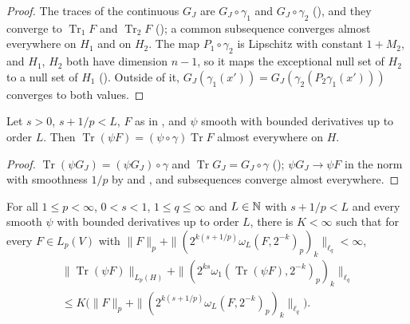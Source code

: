 \begin{proof}
\leanok
The traces of the continuous $G_J$ are $G_J \circ \gamma_1$ and $G_J \circ \gamma_2$
(), and they converge to $\operatorname{Tr}_1 F$ and $\operatorname{Tr}_2 F$
(); a common subsequence converges almost everywhere on $H_1$ and on
$H_2$. The map $P_1 \circ \gamma_2$ is Lipschitz with constant $1 + M_2$, and $H_1$, $H_2$ both have
dimension $n - 1$, so it maps the exceptional null set of $H_2$ to a null set of $H_1$
(). Outside of it, $G_J(\gamma_1(x')) = G_J(\gamma_2(P_2 \gamma_1(x')))$
converges to both values.
\end{proof}

\begin{lemma}
\label{lem:trace-products}
\leanok
{}
Let $s > 0$, $s + 1/p < L$, $F$ as in , and $\psi$ smooth with bounded
derivatives up to order $L$. Then $\operatorname{Tr}(\psi F) = (\psi \circ \gamma) \operatorname{Tr} F$
almost everywhere on $H$.
\end{lemma}

\begin{proof}
\leanok
$\operatorname{Tr}(\psi G_J) = (\psi G_J) \circ \gamma$ and $\operatorname{Tr} G_J = G_J \circ \gamma$
(); $\psi G_J \to \psi F$ in the norm with smoothness $1/p$ by
 and , and subsequences converge almost
everywhere.
\end{proof}

\begin{lemma}
\label{lem:trace-products-bound}
\leanok
{}
For all $1 \leq p < \infty$, $0 < s < 1$, $1 \leq q \leq \infty$ and $L \in \mathbb{N}$ with
$s + 1/p < L$ and every smooth $\psi$ with bounded derivatives up to order $L$, there is
$K < \infty$ such that for every $F \in L_p(V)$ with
$\|F\|_p + \|(2^{k(s + 1/p)} \omega_L(F, 2^{-k})_p)_k\|_{\ell_q} < \infty$,
\begin{multline*}
  \|\operatorname{Tr}(\psi F)\|_{L_p(H)}
    + \|(2^{ks} \omega_1(\operatorname{Tr}(\psi F), 2^{-k})_p)_k\|_{\ell_q}
  \\ \leq K \bigl(\|F\|_p + \|(2^{k(s + 1/p)} \omega_L(F, 2^{-k})_p)_k\|_{\ell_q}\bigr).
\end{multline*}
\end{lemma}

